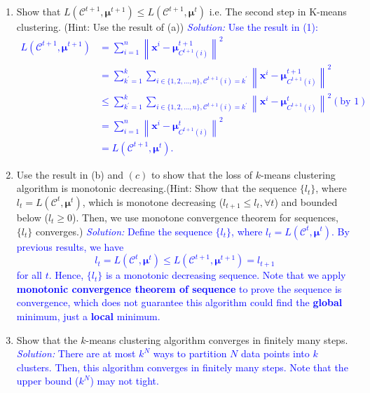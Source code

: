 \documentclass{article}
\def\solColor{blue}
\begin{document}
\begin{enumerate}
    \item Show that $L(\mathcal{C}^{t+1}, \boldsymbol{\mu}^{t+1})\leq L(\mathcal{C}^{t+1}, \boldsymbol{\mu}^{t})$ i.e. The second step in K-means clustering. (Hint: Use the result of (a))
    \textcolor{\solColor}{\textit{Solution:}
    Use the result in (1):
$$
\begin{aligned}
L\left(\mathcal{C}^{t+1}, \boldsymbol{\mu}^{t+1}\right) &=\sum_{i=1}^n\left\|\boldsymbol{x}^i-\boldsymbol{\mu}_{C^{t+1}(i)}^{t+1}\right\|^2 \\
&=\sum_{k^{\prime}=1}^k \sum_{i \in\{1,2, \ldots, n\}, \mathcal{C}^{t+1}(i)=k^{\prime}}\left\|\boldsymbol{x}^i-\boldsymbol{\mu}_{C^{t+1}(i)}^{t+1}\right\|^2 \\
& \leq \sum_{k^{\prime}=1}^k \sum_{i \in\{1,2, \ldots, n\}, \mathcal{C}^{t+1}(i)=k^{\prime}}\left\|\boldsymbol{x}^i-\boldsymbol{\mu}_{C^{t+1}(i)}^t\right\|^2 (\text{by } 1)\\
&=\sum_{i=1}^n\left\|\boldsymbol{x}^i-\boldsymbol{\mu}_{C^{t+1}(i)}^t\right\|^2 \\
&=L\left(\mathcal{C}^{t+1}, \boldsymbol{\mu}^t\right) .
\end{aligned}
$$
    }
    \item Use the result in (b) and $(c)$ to show that the loss of $k$-means clustering algorithm is monotonic decreasing.(Hint: Show that the sequence $\{l_t\}$, where $l_t = L(\mathcal{C}^{t}, \boldsymbol{\mu}^{t})$, which is monotone decreasing ($l_{t+1}\leq l_t, \forall t$) and bounded below ($l_t\geq 0$). Then, we use monotone convergence theorem for sequences, $\{l_t\}$ converges.)
    \textcolor{\solColor}{\textit{Solution:}
    Define the sequence $\{l_t\}$, where $l_t = L(\mathcal{C}^t, \boldsymbol{\mu}^t)$. By previous results, we have
$$
l_t = L(\mathcal{C}^t, \boldsymbol{\mu}^t)\leq L(\mathcal{C}^{t+1}, \boldsymbol{\mu}^{t+1}) = l_{t+1}
$$for all $t$. Hence, $\{l_t\}$ is a monotonic decreasing sequence.
Note that we apply \textbf{monotonic convergence theorem of sequence} to prove the sequence is convergence, which does not guarantee this algorithm could find the \textbf{global} minimum, just a \textbf{local} minimum.
    }
    \item Show that the $k$-means clustering algorithm converges in finitely many steps.
    \textcolor{\solColor}{\textit{Solution:}
    There are at most $k^N$ ways to partition $N$ data points into $k$ clusters. Then, this algorithm converges in finitely many steps. 
Note that the upper bound ($k^N$) may not tight.
    }
\end{enumerate}
\end{document}
